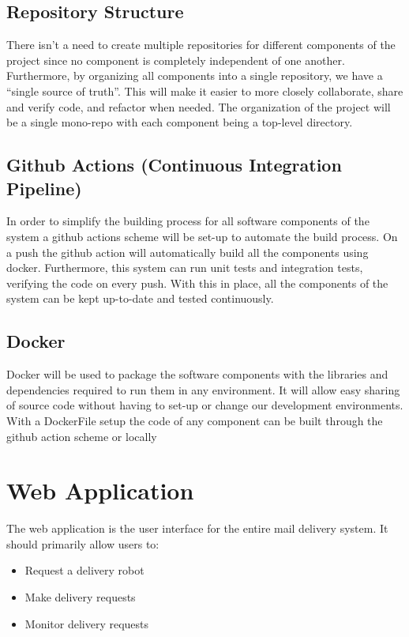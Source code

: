 \documentclass[12pt]{report}
\begin{document}
\subsection{Repository Structure}
There isn’t a need to create multiple repositories for different components of the project since no
component is completely independent of one another. Furthermore, by organizing all
components into a single repository, we have a “single source of truth”. This will make it easier
to more closely collaborate, share and verify code, and refactor when needed.
The organization of the project will be a single mono-repo with each component being a
top-level directory.

\subsection{Github Actions (Continuous Integration Pipeline)}
In order to simplify the building process for all software components of the system a github
actions scheme will be set-up to automate the build process. On a push the github action will
automatically build all the components using docker. Furthermore, this system can run unit tests
and integration tests, verifying the code on every push. With this in place, all the components of
the system can be kept up-to-date and tested continuously.
\subsection{Docker}
Docker will be used to package the software components with the libraries and dependencies
required to run them in any environment. It will allow easy sharing of source code without having
to set-up or change our development environments. With a DockerFile setup the code of any
component can be built through the github action scheme or locally


\section{Web Application}
The web application is the user interface for the entire mail delivery system. It should primarily allow users to:
\begin{itemize}
\itemsep0em 
\item Request a delivery robot
\item Make delivery requests
\item Monitor delivery requests
\end{itemize}
\end{document}
